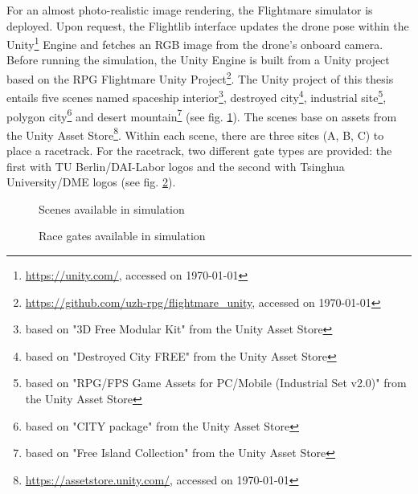 For an almost photo-realistic image rendering,
the Flightmare \cite{Song2020} simulator 
is deployed.
Upon request, the Flightlib interface
updates the drone pose 
within the Unity\footnote{
    \url{https://unity.com/}, accessed on \today
} Engine
and fetches an RGB image from the drone's onboard camera.
Before running the simulation,
the Unity Engine is built from a Unity project
based on the RPG Flightmare Unity Project\footnote{
    \url{https://github.com/uzh-rpg/flightmare_unity}, accessed on \today
}.
The Unity project of this thesis
entails five scenes
named
spaceship interior\footnote{
    based on "3D Free Modular Kit" from the Unity Asset Store
},
destroyed city\footnote{
    based on "Destroyed City FREE" from the Unity Asset Store
},
industrial site\footnote{
    based on "RPG/FPS Game Assets for PC/Mobile (Industrial Set v2.0)" from the Unity Asset Store
},
polygon city\footnote{
    based on "CITY package" from the Unity Asset Store
}
and desert mountain\footnote{
    based on "Free Island Collection" from the Unity Asset Store
}
(see fig. \ref{fig:unity_scenes}).
The scenes base on assets from the Unity Asset Store\footnote{
    \url{https://assetstore.unity.com/}, accessed on \today
}.
Within each scene, there are three sites (A, B, C) to place a racetrack.
For the racetrack, two different gate types are provided:
the first with TU Berlin/DAI-Labor logos and 
the second with Tsinghua University/DME logos
(see fig. \ref{fig:unity_gates}).
\begin{figure}
    \centering
    \par
    \caption[
        Scenes available in simulation
    ]{
        Scenes available in simulation
        \label{fig:unity_scenes}
    }
\end{figure}
\begin{figure}[h]
    \centering
    \caption[
        Race gates available in simulation
    ]{
        Race gates available in simulation
        \label{fig:unity_gates}
    }
\end{figure}

